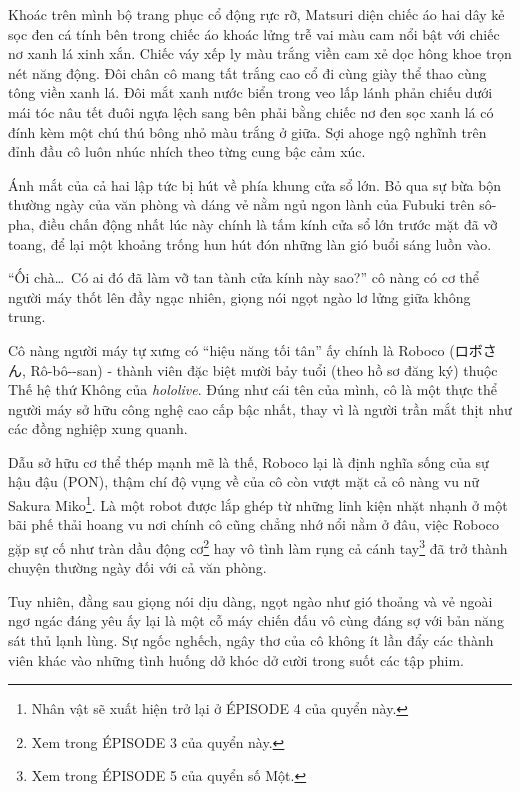 \documentclass[../main.tex]{subfiles}
\begin{document}
Khoác trên mình bộ trang phục cổ động rực rỡ, Matsuri diện chiếc áo hai dây kẻ sọc đen cá tính bên trong chiếc áo khoác lửng trễ vai màu cam nổi bật với chiếc nơ xanh lá xinh xắn. Chiếc váy xếp ly màu trắng viền cam xẻ dọc hông khoe trọn nét năng động. Đôi chân cô mang tất trắng cao cổ đi cùng giày thể thao cùng tông viền xanh lá. Đôi mắt xanh nước biển trong veo lấp lánh phản chiếu dưới mái tóc nâu tết đuôi ngựa lệch sang bên phải bằng chiếc nơ đen sọc xanh lá có đính kèm một chú thú bông nhỏ màu trắng ở giữa. Sợi ahoge ngộ nghĩnh trên đỉnh đầu cô luôn nhúc nhích theo từng cung bậc cảm xúc.

\chrint

Ánh mắt của cả hai lập tức bị hút về phía khung cửa sổ lớn. Bỏ qua sự bừa bộn thường ngày của văn phòng và dáng vẻ nằm ngủ ngon lành của Fubuki trên sô-pha, điều chấn động nhất lúc này chính là tấm kính cửa sổ lớn trước mặt đã vỡ toang, để lại một khoảng trống hun hút đón những làn gió buổi sáng luồn vào.

``Ối chà\dots\ Có ai đó đã làm vỡ tan tành cửa kính này sao?'' cô nàng có cơ thể người máy thốt lên đầy ngạc nhiên, giọng nói ngọt ngào lơ lửng giữa không trung.

\chrint
Cô nàng người máy tự xưng có ``hiệu năng tối tân'' ấy chính là Roboco (ロボさん, Rô-bô--san) - thành viên đặc biệt mười bảy tuổi (theo hồ sơ đăng ký) thuộc Thế hệ thứ Không của \textit{hololive}. Đúng như cái tên của mình, cô là một thực thể người máy sở hữu công nghệ cao cấp bậc nhất, thay vì là người trần mắt thịt như các đồng nghiệp xung quanh.


Dẫu sở hữu cơ thể thép mạnh mẽ là thế, Roboco lại là định nghĩa sống của sự hậu đậu (PON), thậm chí độ vụng về của cô còn vượt mặt cả cô nàng vu nữ Sakura Miko\footnote{Nhân vật sẽ xuất hiện trở lại ở {\flaregothic ÉPISODE 4} của quyển này.}. Là một robot được lắp ghép từ những linh kiện nhặt nhạnh ở một bãi phế thải hoang vu nơi chính cô cũng chẳng nhớ nổi nằm ở đâu, việc Roboco gặp sự cố như tràn dầu động cơ\footnote{Xem trong {\flaregothic ÉPISODE 3} của quyển này.} hay vô tình làm rụng cả cánh tay\footnote{Xem trong {\flaregothic ÉPISODE 5} của quyển số Một.} đã trở thành chuyện thường ngày đối với cả văn phòng.

Tuy nhiên, đằng sau giọng nói dịu dàng, ngọt ngào như gió thoảng và vẻ ngoài ngơ ngác đáng yêu ấy lại là một cỗ máy chiến đấu vô cùng đáng sợ với bản năng sát thủ lạnh lùng. Sự ngốc nghếch, ngây thơ của cô không ít lần đẩy các thành viên khác vào những tình huống dở khóc dở cười trong suốt các tập phim.
\end{document}
